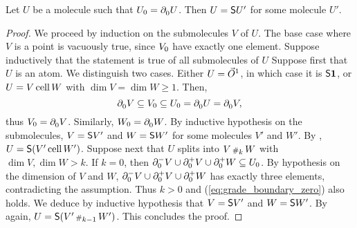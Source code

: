 \begin{lem} \label{lem:has_two_point_is_susp}
    Let \( U \) be a molecule such that \( \gr{0}{U} = \bd{0}{} U \).
    Then \( U = \sus{U'} \) for some molecule \( U' \).
\end{lem}
\begin{proof}
    We proceed by induction on the submolecules \( V \) of \( U \).
    The base case where \( V \) is a point is vacuously true, since \( \gr{0}{V} \) have exactly one element.
    Suppose inductively that the statement is true of all submolecules of \( U \)
    Suppose first that \( U \) is an atom.
    We distinguish two cases.
    Either \( U = \dglobe{1} \), in which case it is \( \sus{\pt} \), or \( U = V \cell W \) with \( \dim V = \dim W \geq 1 \).
    Then, 
    \begin{equation*} \label{eq:grade_boundary_zero}
         \bd{0}{} V \subseteq \gr{0}{V} \subseteq \gr{0}{U} = \bd{0}{} U = \bd{0}{} V,
    \end{equation*}
    thus \( \gr{0}{V} = \bd{0}{} V \).
    Similarly, \( \gr{0}{W} = \bd{0}{} W \).
    By inductive hypothesis on the submolecules, \( V = \sus{V'} \) and \( W = \sus{W'} \) for some molecules \( V' \) and \( W' \).
    By \cite[Proposition 7.3.16]{hadzihasanovic2024combinatorics}, \( U = \sus{(V' \cell W')} \).
    Suppose next that \( U \) splits into \( V \cp{k} W \) with \( \dim V, \dim W > k \).
    If \( k = 0 \), then \( \bd{0}{-} V \cup \bd{0}{+} V \cup \bd{0}{+} W \subseteq \gr{0}{U} \).
    By hypothesis on the dimension of \( V \) and \( W \), \( \bd{0}{-} V \cup \bd{0}{+} V \cup \bd{0}{+} W \) has exactly three elements, contradicting the assumption.
    Thus \( k > 0 \) and (\ref{eq:grade_boundary_zero}) also holds.
    We deduce by inductive hypothesis that \( V = \sus{V'} \) and \( W = \sus{W'} \).
    By \cite[Proposition 7.3.16]{hadzihasanovic2020diagrammatic} again, \( U = \sus{(V' \cp{k - 1} W')} \).
    This concludes the proof.
\end{proof}

